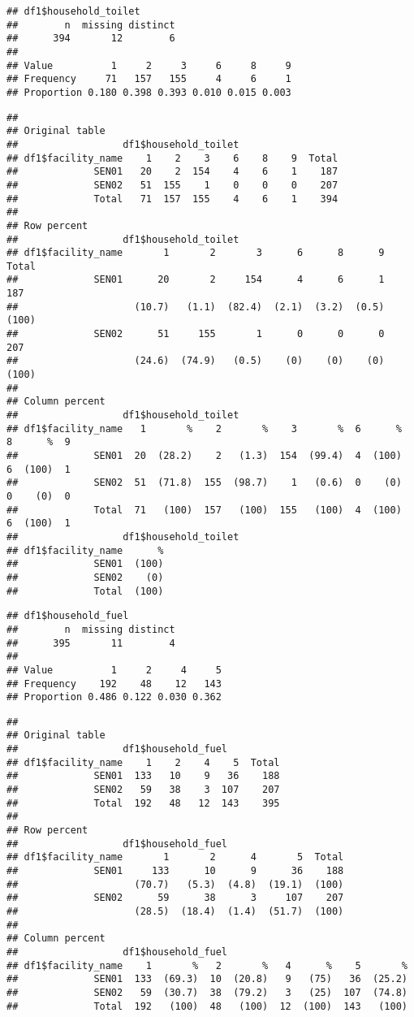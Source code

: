 \documentclass[
]{article}
\begin{document}
\begin{verbatim}
## df1$household_toilet 
##        n  missing distinct 
##      394       12        6 
##                                               
## Value          1     2     3     6     8     9
## Frequency     71   157   155     4     6     1
## Proportion 0.180 0.398 0.393 0.010 0.015 0.003
\end{verbatim}

\begin{verbatim}
## 
## Original table 
##                  df1$household_toilet
## df1$facility_name    1    2    3    6    8    9  Total
##             SEN01   20    2  154    4    6    1    187
##             SEN02   51  155    1    0    0    0    207
##             Total   71  157  155    4    6    1    394
## 
## Row percent 
##                  df1$household_toilet
## df1$facility_name       1       2       3      6      8      9  Total
##             SEN01      20       2     154      4      6      1    187
##                    (10.7)   (1.1)  (82.4)  (2.1)  (3.2)  (0.5)  (100)
##             SEN02      51     155       1      0      0      0    207
##                    (24.6)  (74.9)   (0.5)    (0)    (0)    (0)  (100)
## 
## Column percent 
##                  df1$household_toilet
## df1$facility_name   1       %    2       %    3       %  6      %  8      %  9
##             SEN01  20  (28.2)    2   (1.3)  154  (99.4)  4  (100)  6  (100)  1
##             SEN02  51  (71.8)  155  (98.7)    1   (0.6)  0    (0)  0    (0)  0
##             Total  71   (100)  157   (100)  155   (100)  4  (100)  6  (100)  1
##                  df1$household_toilet
## df1$facility_name      %
##             SEN01  (100)
##             SEN02    (0)
##             Total  (100)
\end{verbatim}

\begin{verbatim}
## df1$household_fuel 
##        n  missing distinct 
##      395       11        4 
##                                   
## Value          1     2     4     5
## Frequency    192    48    12   143
## Proportion 0.486 0.122 0.030 0.362
\end{verbatim}

\begin{verbatim}
## 
## Original table 
##                  df1$household_fuel
## df1$facility_name    1    2    4    5  Total
##             SEN01  133   10    9   36    188
##             SEN02   59   38    3  107    207
##             Total  192   48   12  143    395
## 
## Row percent 
##                  df1$household_fuel
## df1$facility_name       1       2      4       5  Total
##             SEN01     133      10      9      36    188
##                    (70.7)   (5.3)  (4.8)  (19.1)  (100)
##             SEN02      59      38      3     107    207
##                    (28.5)  (18.4)  (1.4)  (51.7)  (100)
## 
## Column percent 
##                  df1$household_fuel
## df1$facility_name    1       %   2       %   4      %    5       %
##             SEN01  133  (69.3)  10  (20.8)   9   (75)   36  (25.2)
##             SEN02   59  (30.7)  38  (79.2)   3   (25)  107  (74.8)
##             Total  192   (100)  48   (100)  12  (100)  143   (100)
\end{verbatim}
\end{document}
